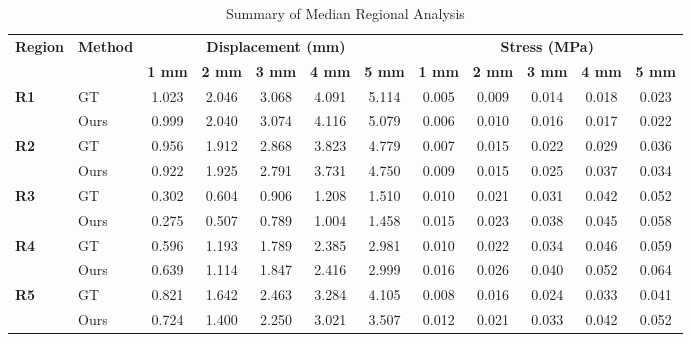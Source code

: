\documentclass{article}
\begin{document}
\thispagestyle{empty}

\begin{table}[h]
\centering
\caption{Summary of Median Regional Analysis}
\vspace{0.3cm}
\begin{tabular}{llcccccccccc}
\toprule
\multirow{2}{*}{\textbf{Region}} & \multirow{2}{*}{\textbf{Method}} & \multicolumn{5}{c}{\textbf{Displacement (mm)}} & \multicolumn{5}{c}{\textbf{Stress (MPa)}} \\
\cmidrule(lr){3-7} \cmidrule(lr){8-12}
& & \textbf{1 mm} & \textbf{2 mm} & \textbf{3 mm} & \textbf{4 mm} & \textbf{5 mm} & \textbf{1 mm} & \textbf{2 mm} & \textbf{3 mm} & \textbf{4 mm} & \textbf{5 mm} \\
\midrule
\multirow{2}{*}{\textbf{R1}} & GT  & 1.023 & 2.046 & 3.068 & 4.091 & 5.114 & 0.005 & 0.009 & 0.014 & 0.018 & 0.023 \\
 & Ours  & 0.999 & 2.040 & 3.074 & 4.116 & 5.079 & 0.006 & 0.010 & 0.016 & 0.017 & 0.022 \\ \midrule
\multirow{2}{*}{\textbf{R2}} & GT  & 0.956 & 1.912 & 2.868 & 3.823 & 4.779 & 0.007 & 0.015 & 0.022 & 0.029 & 0.036 \\
 & Ours  & 0.922 & 1.925 & 2.791 & 3.731 & 4.750 & 0.009 & 0.015 & 0.025 & 0.037 & 0.034 \\ \midrule
\multirow{2}{*}{\textbf{R3}} & GT  & 0.302 & 0.604 & 0.906 & 1.208 & 1.510 & 0.010 & 0.021 & 0.031 & 0.042 & 0.052 \\
 & Ours  & 0.275 & 0.507 & 0.789 & 1.004 & 1.458 & 0.015 & 0.023 & 0.038 & 0.045 & 0.058 \\ \midrule
\multirow{2}{*}{\textbf{R4}} & GT  & 0.596 & 1.193 & 1.789 & 2.385 & 2.981 & 0.010 & 0.022 & 0.034 & 0.046 & 0.059 \\
 & Ours  & 0.639 & 1.114 & 1.847 & 2.416 & 2.999 & 0.016 & 0.026 & 0.040 & 0.052 & 0.064 \\ \midrule
\multirow{2}{*}{\textbf{R5}} & GT  & 0.821 & 1.642 & 2.463 & 3.284 & 4.105 & 0.008 & 0.016 & 0.024 & 0.033 & 0.041 \\
 & Ours  & 0.724 & 1.400 & 2.250 & 3.021 & 3.507 & 0.012 & 0.021 & 0.033 & 0.042 & 0.052 \\
\bottomrule
\end{tabular}
\end{table}
\end{document}
